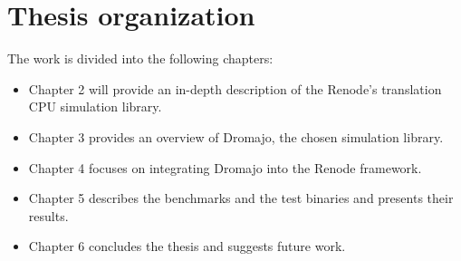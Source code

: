 \section{Thesis organization}

The work is divided into the following chapters:
\begin{itemize}
	\item{Chapter 2 will provide an in-depth description of the Renode's translation CPU simulation library}.
	\item{Chapter 3 provides an overview of Dromajo, the chosen simulation library}.
	\item{Chapter 4 focuses on integrating Dromajo into the Renode framework}.
	\item{Chapter 5 describes the benchmarks and the test binaries and presents their results}.
	\item{Chapter 6 concludes the thesis and suggests future work}.
\end{itemize}